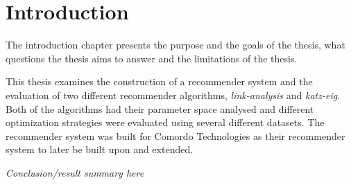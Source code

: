 
\section{Introduction}\label{sec:intro:intro}

The introduction chapter presents the purpose and the goals of the thesis, what questions the thesis aims to answer and the limitations of the thesis.

This thesis examines the construction of a recommender system and the evaluation of two different recommender algorithms, \textit{link-analysis} and \textit{katz-eig}. Both of the algorithms had their parameter space analysed and different optimization strategies were evaluated using several different datasets. The recommender system was built for Comordo Technologies as their recommender system to later be built upon and extended.

\textit{Conclusion/result summary here}


